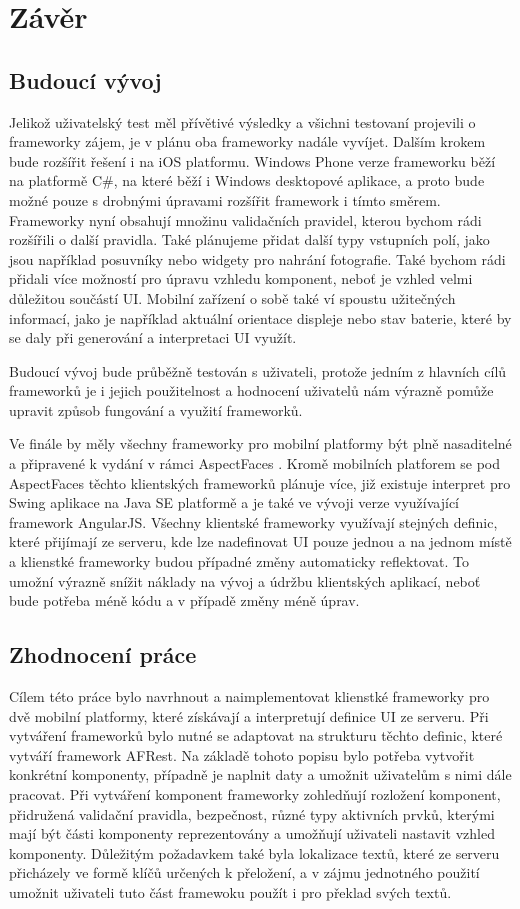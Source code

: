 \chapter{Závěr}
\section{Budoucí vývoj}
Jelikož uživatelský test měl přívětivé výsledky a všichni testovaní projevili o frameworky zájem, je v plánu oba frameworky nadále vyvíjet. Dalším krokem bude rozšířit řešení i na iOS platformu. Windows Phone verze frameworku běží na platformě C\#, na které běží i Windows desktopové aplikace, a proto bude možné pouze s drobnými úpravami rozšířit framework i tímto směrem. Frameworky nyní obsahují množinu validačních pravidel, kterou bychom rádi rozšířili o další pravidla. Také plánujeme přidat další typy vstupních polí, jako jsou například posuvníky nebo widgety pro nahrání fotografie. Také bychom rádi přidali více možností pro úpravu vzhledu komponent, neboť je vzhled velmi důležitou součástí UI. Mobilní zařízení o sobě také ví spoustu užitečných informací, jako je například aktuální orientace displeje nebo stav baterie, které by se daly při generování a interpretaci UI využít.

Budoucí vývoj bude průběžně testován s uživateli, protože jedním z hlavních cílů frameworků je i jejich použitelnost a hodnocení uživatelů nám výrazně pomůže upravit způsob fungování a využití frameworků.

Ve finále by měly všechny frameworky pro mobilní platformy být plně nasaditelné a připravené k vydání v rámci AspectFaces \cite{aspect-faces}. Kromě mobilních platforem se pod AspectFaces těchto klientských frameworků plánuje více, již existuje interpret pro Swing aplikace na Java SE platformě a je také ve vývoji verze využívající framework AngularJS. Všechny klientské frameworky využívají stejných definic, které přijímají ze serveru, kde lze nadefinovat UI pouze jednou a na jednom místě a klienstké frameworky budou případné změny automaticky reflektovat. To umožní výrazně snížit náklady na vývoj a údržbu klientských aplikací, neboť bude potřeba méně kódu a v případě změny méně úprav.

\section{Zhodnocení práce}
Cílem této práce bylo navrhnout a naimplementovat klienstké frameworky pro dvě mobilní platformy, které získávají a interpretují definice UI ze serveru. Při vytváření frameworků bylo nutné se adaptovat na strukturu těchto definic, které vytváří framework AFRest. Na základě tohoto popisu bylo potřeba vytvořit konkrétní komponenty, případně je naplnit daty a umožnit uživatelům s nimi dále pracovat. Při vytváření komponent frameworky zohledňují rozložení komponent, přidružená validační pravidla, bezpečnost, různé typy aktivních prvků, kterými mají být části komponenty reprezentovány a umožňují uživateli nastavit vzhled komponenty. Důležitým požadavkem také byla lokalizace textů, které ze serveru přicházely ve formě klíčů určených k přeložení, a v zájmu jednotného použití umožnit uživateli tuto část framewoku použít i pro překlad svých textů. 

